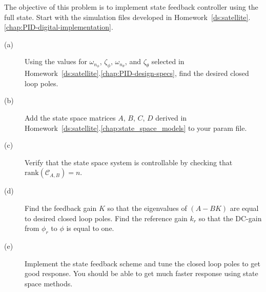 
The objective of this problem is to implement state feedback controller using the full state.
Start with the simulation files developed in Homework~\ref{ds:satellite}.\ref{chap:PID-digital-implementation}.
\begin{description}
\item[(a)] Using the values for $\omega_{n_\phi}$, $\zeta_\phi$, $\omega_{n_{\theta}}$, and $\zeta_{\theta}$ selected in Homework~\ref{ds:satellite}.\ref{chap:PID-design-specs}, find the desired closed loop poles.  
\item[(b)] Add the state space matrices $A$, $B$, $C$, $D$ derived in Homework~\ref{ds:satellite}.\ref{chap:state_space_models} to your param file.
\item[(c)] Verify that the state space system is controllable by checking that $\text{rank}(\mathcal{C}_{A,B})=n$.
\item[(d)] Find the feedback gain $K$ so that the eigenvalues of $(A-BK)$ are equal to desired closed loop poles.  Find the reference gain $k_r$ so that the DC-gain from $\phi_r$ to $\phi$ is equal to one.  
\item[(e)] Implement the state feedback scheme and tune the closed loop poles to get good response.  You should be able to get much faster response using state space methods.
\end{description}